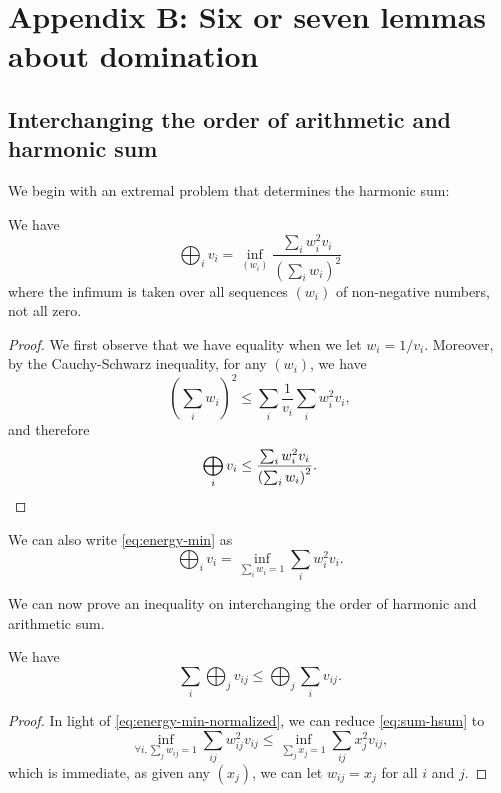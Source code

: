 \section{Appendix B: Six or seven lemmas about domination} \label{app:dom}
\subsection{Interchanging the order of arithmetic and harmonic sum}
We begin with an extremal problem that determines the harmonic sum:
\begin{lemma}
We have 
\begin{equation} \label{eq:energy-min}
\bigoplus_i v_i = \inf_{(w_i)} \frac{\sum_i w_i^2 v_i}{\left(\sum_i w_i\right)^2}
\end{equation}
where the infimum is taken over all sequences $(w_i)$ of non-negative numbers, not all zero. 
\end{lemma}
\begin{proof}
We first observe that we have equality when we let $w_i = 1/v_i$. Moreover, by the Cauchy-Schwarz inequality,
for any $(w_i)$, we have
$$
\left(\sum_i w_i\right)^2 \le \sum_i \frac 1{v_i} \sum_i w_i^2 v_i,
$$
and therefore
$$
\bigoplus_i v_i \le \frac{\sum_i w_i^2 v_i}{\left(\sum_i w_i\right)^2}. \qedhere
$$
\end{proof}
We can also write \eqref{eq:energy-min} as 
\begin{equation} \label{eq:energy-min-normalized}
\bigoplus_i v_i = \inf_{\sum_i w_i = 1} \sum_i w_i^2 v_i.
\end{equation}

We can now prove an inequality on interchanging the order of harmonic and arithmetic sum. 
\begin{lemma} \label{lem:sum-hsum}
We have
\begin{equation} \label{eq:sum-hsum}
\sum_i \bigoplus_j v_{ij} \le \bigoplus_j \sum_i v_{ij}.
\end{equation}
\end{lemma}
\begin{proof}
In light of \eqref{eq:energy-min-normalized},
we can reduce \eqref{eq:sum-hsum}  to 
\begin{equation}
\inf_{\forall i, \sum_j w_{ij} = 1} \sum_{ij} w_{ij}^2 v_{ij} \le \inf_{\sum_j x_j = 1} \sum_{ij} x_j^2 v_{ij},
\end{equation}
which is immediate, as given any $(x_j)$, we can let $w_{ij} = x_j$ for all $i$ and $j$. 
\end{proof}


